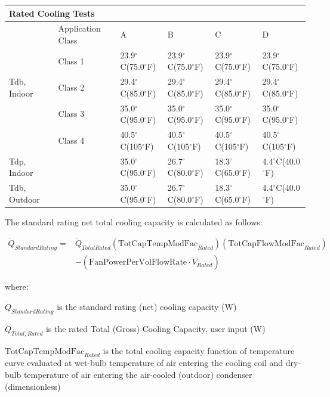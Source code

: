 \begin{longtable}[c]{p{1.0in}p{1.0in}p{1.0in}p{1.0in}p{1.0in}p{1.0in}}
\toprule 
\multicolumn{6}{l}{Rated Cooling Tests} \tabularnewline \midrule
\endhead
& Application Class & A & B & C & D \tabularnewline
& Class 1 & 23.9\(^{\circ}\)C(75.0\(^{\circ}\)F) & 23.9\(^{\circ}\)C(75.0\(^{\circ}\)F) & 23.9\(^{\circ}\)C(75.0\(^{\circ}\)F) & 23.9\(^{\circ}\)C(75.0\(^{\circ}\)F) \tabularnewline
Tdb, Indoor & Class 2 & 29.4\(^{\circ}\)C(85.0\(^{\circ}\)F) & 29.4\(^{\circ}\)C(85.0\(^{\circ}\)F) & 29.4\(^{\circ}\)C(85.0\(^{\circ}\)F) & 29.4\(^{\circ}\)C(85.0\(^{\circ}\)F) \tabularnewline
& Class 3 & 35.0\(^{\circ}\)C(95.0\(^{\circ}\)F) & 35.0\(^{\circ}\)C(95.0\(^{\circ}\)F) & 35.0\(^{\circ}\)C(95.0\(^{\circ}\)F) & 35.0\(^{\circ}\)C(95.0\(^{\circ}\)F) \tabularnewline
& Class 4 & 40.5\(^{\circ}\)C(105\(^{\circ}\)F) & 40.5\(^{\circ}\)C(105\(^{\circ}\)F) & 40.5\(^{\circ}\)C(105\(^{\circ}\)F) & 40.5\(^{\circ}\)C(105\(^{\circ}\)F) \tabularnewline
Tdp, Indoor &  & 35.0\(^{\circ}\)C(95.0\(^{\circ}\)F) & 26.7\(^{\circ}\)C(80.0\(^{\circ}\)F) & 18.3\(^{\circ}\)C(65.0\(^{\circ}\)F) & 4.4\(^{\circ}\)C(40.0\(^{\circ}\)F) \tabularnewline
Tdb, Outdoor &  & 35.0\(^{\circ}\)C(95.0\(^{\circ}\)F) & 26.7\(^{\circ}\)C(80.0\(^{\circ}\)F) & 18.3\(^{\circ}\)C(65.0\(^{\circ}\)F) & 4.4\(^{\circ}\)C(40.0\(^{\circ}\)F) \tabularnewline
\bottomrule
\end{longtable}

The standard rating net total cooling capacity is calculated as follows:

\begin{equation}
\begin{array}{rl}
\dot{Q}_{StandardRating} =& \dot{Q}_{TotalRated}\left(\text{TotCapTempModFac}_{Rated}\right)\left(\text{TotCapFlowModFac}_{Rated}\right) \\
& - \left(\text{FanPowerPerVolFlowRate} \cdot \dot{V}_{Rated}\right)
\end{array}
\end{equation}

where:

\(\dot{Q}_{StandardRating}\) is the standard rating (net) cooling capacity (W)

\(\dot{Q}_{Total,Rated}\) is the rated Total (Gross) Cooling Capacity, user input (W)

\(\text{TotCapTempModFac}_{Rated}\) is the total cooling capacity function of temperature curve evaluated at wet-bulb temperature of air entering the cooling coil and dry-bulb temperature of air entering the air-cooled (outdoor) condenser (dimensionless)

